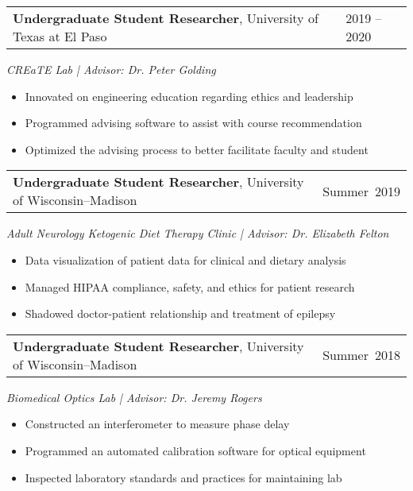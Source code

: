 \documentclass[12pt]{article}
\begin{document}
\noindent\begin{tabular*}{\textwidth}{@{}p{} p{}@{}}\textbf{Undergraduate Student Researcher}, University of Texas at El Paso & 2019 -- 2020\\\end{tabular*}
\vspace{0.6ex}
\textit{CREaTE Lab \;|\; Advisor: Dr. Peter Golding}
\begin{itemize}
  \item Innovated on engineering education regarding ethics and leadership
  \item Programmed advising software to assist with course recommendation
  \item Optimized the advising process to better facilitate faculty and student
\end{itemize}

\noindent\begin{tabular*}{\textwidth}{@{}p{} p{}@{}}\textbf{Undergraduate Student Researcher}, University of Wisconsin--Madison & Summer~2019\\\end{tabular*}
\vspace{0.6ex}
\textit{Adult Neurology Ketogenic Diet Therapy Clinic \;|\; Advisor: Dr. Elizabeth Felton}
\begin{itemize}
  \item Data visualization of patient data for clinical and dietary analysis
  \item Managed HIPAA compliance, safety, and ethics for patient research
  \item Shadowed doctor-patient relationship and treatment of epilepsy
\end{itemize}

\noindent\begin{tabular*}{\textwidth}{@{}p{} p{}@{}}\textbf{Undergraduate Student Researcher}, University of Wisconsin--Madison & Summer~2018\\\end{tabular*}
\vspace{0.6ex}
\textit{Biomedical Optics Lab \;|\; Advisor: Dr. Jeremy Rogers}
\begin{itemize}
  \item Constructed an interferometer to measure phase delay
  \item Programmed an automated calibration software for optical equipment
  \item Inspected laboratory standards and practices for maintaining lab
\end{itemize}
\end{document}
